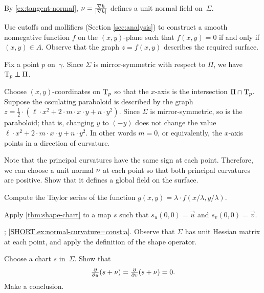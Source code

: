 \begin{multicols}{2}
By \ref{ex:tangent-normal}, $\nu=\tfrac{\nabla h}{|\nabla h|}$ defines a unit normal field on~$\Sigma$.

Use cutoffs and mollifiers (Section \ref{sec:analysis}) to construct a smooth nonnegative function $f$ on the $(x,y)$-plane such that $f(x,y)=0$ if and only if $(x,y)\in A$.
Observe that the graph $z=f(x,y)$ describes the required surface.


\setcounter{eqtn}{0}

Fix a point $p$ on~$\gamma$.
Since $\Sigma$ is mirror-symmetric with respect to $\Pi$,
we have $\mathrm{T}_p\perp \Pi$.

Choose $(x,y)$-coordinates on $\mathrm{T}_p$ so that the $x$-axis is the intersection $\Pi\cap \mathrm{T}_p$.
Suppose the osculating paraboloid is described by the graph 
$z=\tfrac12\cdot(\ell\cdot x^2+2\cdot m\cdot x\cdot y+n\cdot y^2)$.
Since $\Sigma$ is mirror-symmetric, so is the paraboloid;
that is, changing $y$ to $(-y)$ does not change the value 
$\ell\cdot x^2+2\cdot m\cdot x\cdot y+n\cdot y^2$.
In other words $m=0$, or equivalently, the $x$-axis points in a direction of curvature.

 Note that the principal curvatures have the same sign at each point.
Therefore, we can choose a unit normal $\nu$ at each point so that both principal curvatures are positive.
Show that it defines a global field on the surface.


 Compute the Taylor series of the function $g(x,y)= \lambda \cdot f( x/ \lambda , y/\lambda)$.


Apply \ref{thm:shape-chart} to a map $s$ such that $s_u(0,0)=\vec u$ and $s_v(0,0)=\vec v$.

\parbf{\ref{ex:normal-curvature=const}}; \ref{SHORT.ex:normal-curvature=const:a}.
Observe that $\Sigma$ has unit Hessian matrix at each point, and apply the definition of the shape operator.

Choose a chart $s$ in~$\Sigma$.
Show that
\[\tfrac{\partial }{\partial u}(s+\nu)
=
\tfrac{\partial }{\partial v}(s+\nu)
=
0.\]
Make a conclusion.


\end{multicols}
